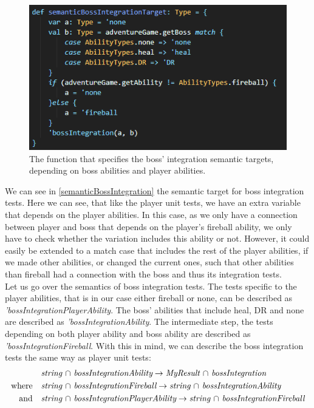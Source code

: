 \begin{figure}[]
    \centering
    \includegraphics[width=0.6\linewidth]{Materials/TestingDiscussion/semanticBossIntegrationTarget}
    \caption{The function that specifies the boss' integration semantic targets, depending on boss abilities and player abilities.}
    \label{semanticBossIntegration}
\end{figure}
We can see in \autoref{semanticBossIntegration} the semantic target for boss integration tests. Here we can see, that like the player unit tests, we have an extra variable that depends on the player abilities. In this case, as we only have a connection between player and boss that depends on the player's fireball ability, we only have to check whether the variation includes this ability or not. However, it could easily be extended to a match case that includes the rest of the player abilities, if we made other abilities, or changed the current ones, such that other abilities than fireball had a connection with the boss and thus its integration tests. \\
Let us go over the semantics of boss integration tests. The tests specific to the player abilities, that is in our case either fireball or none, can be described as \textit{'bossIntegrationPlayerAbility}. The boss' abilities that include heal, DR and none are described as \textit{'bossIntegrationAbility}. The intermediate step, the tests depending on both player ability and boss ability are described as \textit{'bossIntegrationFireball}.
With this in mind, we can describe the boss integration tests the same way as player unit tests:
\begin{align*}
&\textit{string $\cap$ bossIntegrationAbility} \to \textit{MyResult $\cap$ bossIntegration} \\
\text{where\quad} &\textit{string $\cap$ bossIntegrationFireball} \to \textit{string $\cap$ bossIntegrationAbility} \\
\text{and\quad} &\textit{string $\cap$ bossIntegrationPlayerAbility} \to \textit{string $\cap$ bossIntegrationFireball}
\end{align*}
